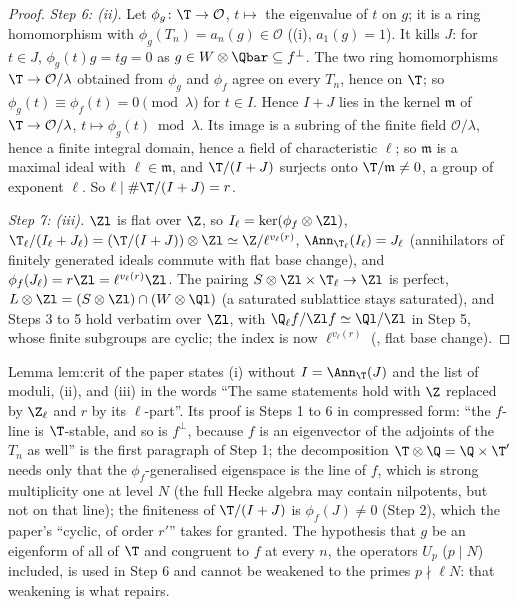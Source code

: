 \begin{proof}
\emph{Step 6: (ii).} Let $\phi_g\colon\T\to\mathcal{O}$, $t\mapsto$ the eigenvalue of $t$ on $g$; it is a ring homomorphism with $\phi_g(T_n)=a_n(g)\in\mathcal{O}$
((i), $a_1(g)=1$). It kills $J$: for $t\in J$, $\phi_g(t)g=tg=0$ as $g\in W\otimes\Qbar\subseteq f^\perp$. The two ring homomorphisms $\T\to\mathcal{O}/\lambda$ obtained
from $\phi_g$ and $\phi_f$ agree on every $T_n$, hence on $\T$; so $\phi_g(t)\equiv\phi_f(t)=0\pmod\lambda$ for $t\in I$. Hence $I+J$ lies in the kernel $\mathfrak m$ of $\T\to\mathcal{O}/\lambda$,
$t\mapsto\phi_g(t)\bmod\lambda$. Its image is a subring of the finite field $\mathcal{O}/\lambda$, hence a finite integral domain, hence a field of characteristic $\ell$; so $\mathfrak m$ is a
maximal ideal with $\ell\in\mathfrak m$, and $\T/(I+J)$ surjects onto $\T/\mathfrak m\ne0$, a group of exponent $\ell$. So $\ell\mid\#\T/(I+J)=r$.

\emph{Step 7: (iii).} $\Zl$ is flat over $\Z$, so $I_\ell=\ker(\phi_f\otimes\Zl)$, $\T_\ell/(I_\ell+J_\ell)=(\T/(I+J))\otimes\Zl\simeq\Z/\ell^{v_\ell(r)}$, $\Ann_{\T_\ell}(I_\ell)=J_\ell$ (annihilators of finitely
generated ideals commute with flat base change), and $\phi_f(J_\ell)=r\Zl=\ell^{v_\ell(r)}\Zl$. The pairing $S\otimes\Zl\times\T_\ell\to\Zl$ is perfect, $L\otimes\Zl=(S\otimes\Zl)\cap(W\otimes\Ql)$ (a
saturated sublattice stays saturated), and Steps 3 to 5 hold verbatim over $\Zl$, with $\Q_\ell f/\Zl f\simeq\Ql/\Zl$ in Step 5, whose finite subgroups are cyclic; the
index is now $\ell^{v_\ell(r)}$ (, flat base change).
\end{proof}

\begin{paperlink}
Lemma lem:crit of the paper states (i) without $I=\Ann_\T(J)$ and the list of moduli, (ii), and (iii) in the words ``The same statements hold with $\Z$
replaced by $\Z_\ell$ and $r$ by its $\ell$-part''. Its proof is Steps 1 to 6 in compressed form: ``the $f$-line is $\T$-stable, and so is $f^\perp$, because $f$ is an
eigenvector of the adjoints of the $T_n$ as well'' is the first paragraph of Step 1; the decomposition $\T\otimes\Q=\Q\times\T'$ needs only that the
$\phi_f$-generalised eigenspace is the line of $f$, which is strong multiplicity one at level $N$ (the full Hecke algebra may contain nilpotents, but not
on that line); the finiteness of $\T/(I+J)$ is $\phi_f(J)\ne0$ (Step 2), which the paper's ``cyclic, of order $r'$'' takes for granted. The hypothesis that $g$ be an
eigenform of all of $\T$ and congruent to $f$ at every $n$, the operators $U_p$ ($p\mid N$) included, is used in Step 6 and cannot be weakened to the primes
$p\nmid\ell N$: that weakening is what  repairs.
\end{paperlink}

